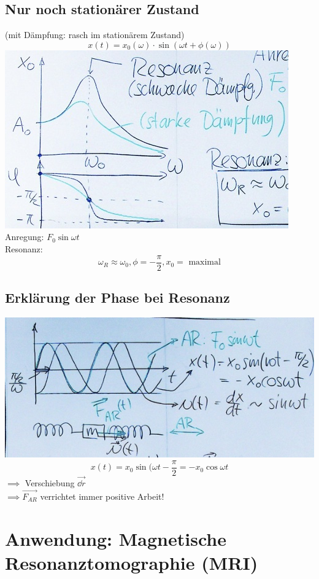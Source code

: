 \subsection{Nur noch stationärer Zustand}
(mit Dämpfung: rasch im stationärem Zustand)
\[ \boxed{ x(t) = x_0(\omega) \cdot \sin( \omega t + \phi(\omega) ) } \]
\includegraphics{Bild218} \\
Anregung: $F_0 \sin \omega t$ \\
Resonanz:
\[ \boxed{ \omega_R \approx \omega_0 , \phi = -\frac{\pi}{2} , x_0 = \text{ maximal} } \]

\subsection{Erklärung der Phase bei Resonanz}
\includegraphics{Bild219}
\[ x(t) = x_0 \sin( \omega t - \frac{\pi}{2} = - x_0 \cos \omega t \]
$\implies$ Verschiebung $\vec{\dd r}$ \\
$\implies \vec{F_{AR}}$ verrichtet immer positive Arbeit!

\section{Anwendung: Magnetische Resonanztomographie (MRI)}
